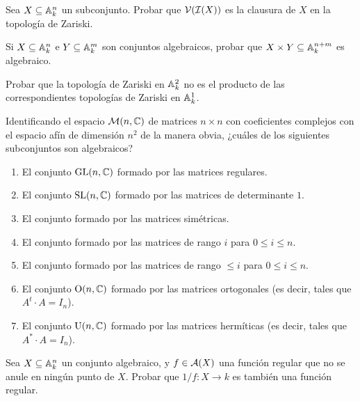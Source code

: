 \documentclass[ACGA.tex]{subfiles}
\begin{document}
\begin{ejer}\label{clausura}
 Sea $X\subseteq \mathbb{A}^n_k$ un subconjunto. Probar que $\mathcal{V}(\mathcal{I}(X))$ es la clausura de $X$ en la topología de Zariski.
\end{ejer}

\begin{ejer}\label{productoafin}
 Si $X\subseteq \mathbb{A}^n_k$ e $Y\subseteq \mathbb{A}^m_k$ son conjuntos algebraicos, probar que $X\times Y\subseteq \mathbb{A}^{n+m}_k$ es algebraico.
\end{ejer}

\begin{ejer}
 Probar que la topología de Zariski en $\mathbb{A}^2_k$ no es el producto de las correspondientes topologías de Zariski en $\mathbb{A}^1_k$.
\end{ejer}

\begin{ejer}Identificando el espacio ${\mathcal M}(n,\mathbb{C})$ de matrices $n\times n$ con coeficientes complejos con el espacio afín de dimensión $n^2$ de la manera obvia, ¿cuáles de los siguientes subconjuntos son algebraicos?
 
\begin{enumerate}
 \item El conjunto $\mathrm{GL}(n,\mathbb{C})$ formado por las matrices regulares.
 \item El conjunto $\mathrm{SL}(n,\mathbb{C})$ formado por las matrices de determinante $1$.
 \item El conjunto formado por las matrices simétricas.
 \item El conjunto formado por las matrices de rango $i$ para $0\leq i\leq n$.
 \item El conjunto formado por las matrices de rango $\leq i$ para $0\leq i\leq n$.
 \item El conjunto $\mathrm{O}(n,\mathbb{C})$ formado por las matrices ortogonales (es decir, tales que $A^t\cdot A=I_n$).
 \item El conjunto $\mathrm{U}(n,\mathbb{C})$ formado por las matrices hermíticas (es decir, tales que $A^\ast\cdot A=I_n$).
\end{enumerate}

\end{ejer}


\begin{ejer} Sea $X\subseteq\mathbb{A}^n_k$ un conjunto algebraico, y $f\in\mathcal{A}(X)$ una función regular que no se anule en ningún punto de $X$. Probar que $1/f:X\to k$ es también una función regular.
 \end{ejer}
\end{document}
